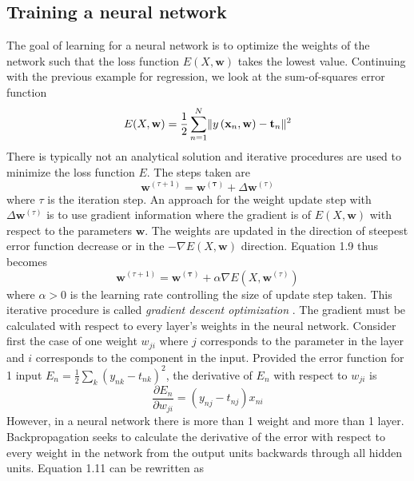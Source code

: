 \subsection{Training a neural network}
The goal of learning for a neural network is to optimize the weights of the network such that the loss function $E(X, \mathbf{w})$ takes the lowest value. Continuing with the previous example for regression, we look at the sum-of-squares error function 
\begin{equation}
    E(X, \mathbf{w}) = \frac{1}{2}\sum_{n=1}^{N} \lVert y\left(\mathbf{x}_n, \mathbf{w}  \right) - \mathbf{t}_n\rVert^2
\end{equation}
There is typically not an analytical solution and iterative procedures are used to minimize the loss function $E$. The steps taken are
\begin{equation}
    \mathbf{w}^{(\tau+1)} = \mathbf{w^{(\tau)}} + \Delta \mathbf{w}^{(\tau)}
\end{equation} where $\tau$ is the iteration step. An approach for the weight update step with $\Delta \mathbf{w}^{(\tau)}$ is to use gradient information where the gradient is of $E(X, \mathbf{w})$ with respect to the parameters $\mathbf{w}$. The weights are updated in the direction of steepest error function decrease or in the $- \nabla E(X, \mathbf{w})$ direction. Equation 1.9 thus becomes
\begin{equation}
     \mathbf{w}^{(\tau+1)} = \mathbf{w^{(\tau)}} + \alpha \nabla E\left( X, \mathbf{w}^{(\tau)} \right)
\end{equation} where $\alpha > 0$ is the learning rate controlling the size of update step taken. This iterative procedure is called 
\textit{gradient descent optimization} \cite{RumHinWil:86}. The gradient must be calculated with respect to every layer's weights in the 
neural network. Consider first the case of one weight $w_{ji}$ where $j$ corresponds to the parameter in the layer and $i$ corresponds to the 
component in the input. Provided the error function for 1 input $E_n = \frac{1}{2} \sum_{k} (y_{nk} - t_{nk})^2$, the derivative of 
$E_n$ with respect to $w_{ji}$ is 
\begin{equation}
    \frac{\partial E_n}{\partial w_{ji}} = (y_{nj} - t_{nj})x_{ni}
\end{equation}
However, in a neural network there is more than 1 weight and more than 1 layer. Backpropagation seeks to calculate the derivative of the 
error with respect to every weight in the network from the output units backwards through all hidden units. Equation 1.11 can be rewritten as 
